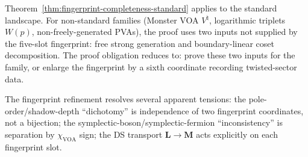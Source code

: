 \begin{remark}
\label{rem:fingerprint-nonstandard-open}
Theorem~\ref{thm:fingerprint-completeness-standard} applies to the standard landscape. For non-standard families (Monster VOA $V^\natural$, logarithmic triplets $W(p)$, non-freely-generated PVAs), the proof uses two inputs not supplied by the five-slot fingerprint: free strong generation and boundary-linear coset decomposition. The proof obligation reduces to: prove these two inputs for the family, or enlarge the fingerprint by a sixth coordinate recording twisted-sector data.
\end{remark}

The fingerprint refinement resolves several apparent tensions: the pole-order/shadow-depth ``dichotomy'' is independence of two fingerprint coordinates, not a bijection; the symplectic-boson/symplectic-fermion ``inconsistency'' is separation by $\chi_{\mathrm{VOA}}$ sign; the DS transport $\mathbf{L} \to \mathbf{M}$ acts explicitly on each fingerprint slot.
